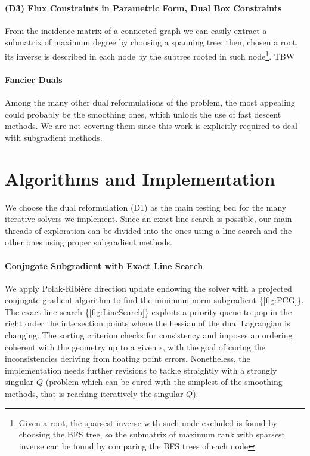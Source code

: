 \documentclass[10pt,twoside,book,a5paper]{ncc}
\begin{document}
\paragraph{(D3) Flux Constraints in Parametric Form, Dual Box Constraints}
From the incidence matrix of a connected graph we can easily extract a submatrix of maximum degree by choosing a spanning tree; then, chosen a root, its inverse is described in each node by the subtree rooted in such node\footnote{Given a root, the sparsest inverse with such node excluded is found by choosing the BFS tree, so the submatrix of maximum rank with sparsest inverse can be found by comparing the BFS trees of each node}.
TBW
\paragraph{Fancier Duals}
Among the many other dual reformulations of the problem, the most appealing could probably be the smoothing ones, which unlock the use of fast descent methods\cite{Universal}. We are not covering them since this work is explicitly required to deal with subgradient methods.

\section{Algorithms and Implementation}
We choose the dual reformulation (D1) as the main testing bed for the many iterative solvers we implement. Since an exact line search is possible, our main threads of exploration can be divided into the ones using a line search and the other ones using proper subgradient methods.
\paragraph{Conjugate Subgradient with Exact Line Search} We apply Polak-Ribière direction update endowing the solver with a projected conjugate gradient algorithm to find the minimum norm subgradient \{\ref{fig:PCG}\}. The exact line search \{\ref{fig:LineSearch}\} exploits a priority queue to pop in the right order the intersection points where the hessian of the dual Lagrangian is changing. The sorting criterion checks for consistency and imposes an ordering coherent with the geometry up to a given $\epsilon$, with the goal of curing the inconsistencies deriving from floating point errors. Nonetheless, the implementation needs further revisions to tackle straightly with a strongly singular $Q$ (problem which can be cured with the simplest of the smoothing methods, that is reaching iteratively the singular $Q$).
\end{document}
